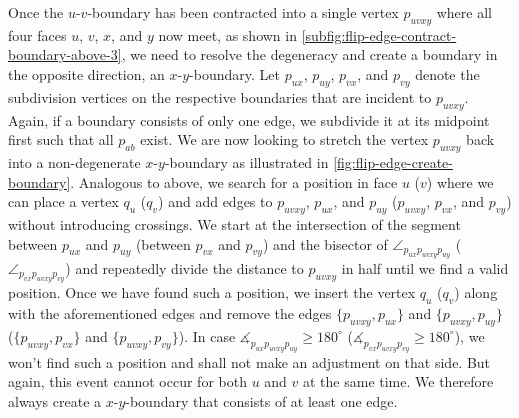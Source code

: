 Once the $u$-$v$-boundary has been contracted into a single vertex $p_{uvxy}$ where all four faces $u$, $v$, $x$, and $y$ now meet, as shown in \cref{subfig:flip-edge-contract-boundary-above-3}, we need to resolve the degeneracy and create a boundary in the opposite direction, \ie{} an $x$-$y$-boundary.
Let $p_{ux}$, $p_{uy}$, $p_{vx}$, and $p_{vy}$ denote the subdivision vertices on the respective boundaries that are incident to $p_{uvxy}$. Again, if a boundary consists of only one edge, we subdivide it at its midpoint first such that all $p_{ab}$ exist.
We are now looking to stretch the vertex $p_{uvxy}$ back into a non-degenerate $x$-$y$-boundary as illustrated in \cref{fig:flip-edge-create-boundary}. Analogous to above, we search for a position in face $u$ ($v$) where we can place a vertex $q_u$ ($q_v$) and add edges to $p_{uvxy}$, $p_{ux}$, and $p_{uy}$ ($p_{uvxy}$, $p_{vx}$, and $p_{vy}$) without introducing crossings. We start at the intersection of the segment between $p_{ux}$ and $p_{uy}$ (between $p_{vx}$ and $p_{vy}$) and the bisector of $\angle_{p_{ux}p_{uvxy}p_{uy}}$ ($\angle_{p_{vx}p_{uvxy}p_{vy}}$) and repeatedly divide the distance to $p_{uvxy}$ in half until we find a valid position. Once we have found such a position, we insert the vertex $q_u$ ($q_v$) along with the aforementioned edges and remove the edges $\{p_{uvxy},p_{ux}\}$ and $\{p_{uvxy},p_{uy}\}$ ($\{p_{uvxy},p_{vx}\}$ and $\{p_{uvxy},p_{vy}\}$). In case $\measuredangle_{p_{ux}p_{uvxy}p_{uy}} \geq 180^\circ$ ($\measuredangle_{p_{vx}p_{uvxy}p_{vy}} \geq 180^\circ$), we won't find such a position and shall not make an adjustment on that side. But again, this event cannot occur for both $u$ and $v$ at the same time. We therefore always create a $x$-$y$-boundary that consists of at least one edge.

